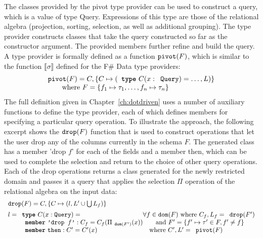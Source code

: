 \documentclass[fleqn,11pt]{report}
\newcommand{\kvd}[1]{\textnormal{\ttfamily\bfseries #1}}
\newcommand{\ident}[1]{\textnormal{\ttfamily #1}}
\newcommand{\qident}[1]{\textnormal{\ttfamily '#1'}}
\theoremstyle{definition}
\newcommand{\sem}[1]{\llbracket #1 \rrbracket}
\begin{document}
The classes provided by the pivot type provider can be used to construct a query, which is a
value of type \ident{Query}. Expressions of this type are those of the relational algebra
(projection, sorting, selection, as well as additional grouping). The type provider constructs
classes that take the query constructed so far as the constructor argument. The provided members
further refine and build the query. A type provider is formally defined as a function
$\ident{pivot}(F)$, which is similar to the function $\sem{\sigma}$ defined for the F\# Data
type providers:
%
\begin{equation*}
\begin{array}{l}
\ident{pivot}(F) = C, \{ C \mapsto (\kvd{type}~C(x:\ident{Query}) = \ldots,L) \}\\
  \qquad \textnormal{where}~F=\{ f_1 \mapsto \tau_1, \ldots, f_n \mapsto \tau_n \}
\end{array}
\end{equation*}
%
The full definition given in Chapter~\ref{ch:dotdriven} uses a number of auxiliary functions to
define the type provider, each of which defines members for specifying a particular query operation.
To illustrate the approach, the following excerpt shows the $\ident{drop}(F)$ function that is used
to construct operations that let the user drop any of the columns currently in the schema $F$.
The generated class has a member \qident{drop $f$} for each of the fields and a member
\ident{then}, which can be used to complete the selection and return to the choice of other query
operations. Each of the \ident{drop} operations returns a class generated for the newly restricted
domain and passes it a query that applies the selection $\Pi$ operation of the relational algebra
on the input data:
%
\begin{equation*}
\begin{array}{ll}
\ident{drop}(F) = C, \{ C \mapsto (l, L' \cup \bigcup L_f) \}\qquad\\[0.5em]
l = \kvd{type}~C(x:\ident{Query}) = &\hspace{-1em}\forall f \in \ident{dom}(F)~\textnormal{where}~C_f, L_f = \ident{drop}(F')\\
~~\qquad \kvd{member}~\qident{drop $f$} : C_f = C_f(\Pi_{\ident{dom}(F')}(x)) & \quad\textnormal{and}~ F' = \{ f'\mapsto\tau'\in F, f' \neq f\}\\
~~\qquad \kvd{member}~\ident{then} : C' = C'(x)\qquad                 &\textnormal{where}~C', L' = \ident{pivot}(F)\\
\end{array}
\end{equation*}
\end{document}
